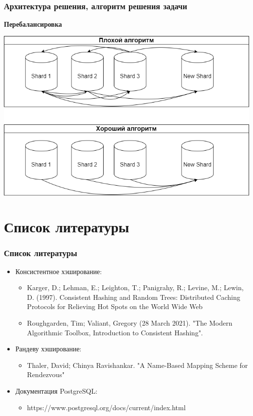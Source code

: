 \documentclass[pdf, hyperref={unicode}, aspectratio=169]{beamer}
\begin{document}
\begin{frame}
	\frametitle{Архитектура решения, алгоритм решения задачи}
	\textbf{Перебалансировка}
	
	\vspace{1.5em}
	\centering
	\includegraphics[width=\textheight]{img/resharding.png}
\end{frame}

\section{Список литературы}
\begin{frame}
	\frametitle{Список литературы}

	\begin{itemize}
		\item Консистентное хэширование:
		\begin{itemize}
			\item Karger, D.; Lehman, E.; Leighton, T.; Panigrahy, R.; Levine, M.; Lewin, D. (1997). Consistent Hashing and Random Trees: Distributed Caching Protocols for Relieving Hot Spots on the World Wide Web
			\item Roughgarden, Tim; Valiant, Gregory (28 March 2021). "The Modern Algorithmic Toolbox, Introduction to Consistent Hashing".
		\end{itemize} 

		\item Рандеву хэширование:
		\begin{itemize}
			\item Thaler, David; Chinya Ravishankar. "A Name-Based Mapping Scheme for Rendezvous"
		\end{itemize} 
		\item Документация PostgreSQL:
		\begin{itemize}
			\item https://www.postgresql.org/docs/current/index.html
		\end{itemize}
	\end{itemize}
\end{frame}
\end{document}
